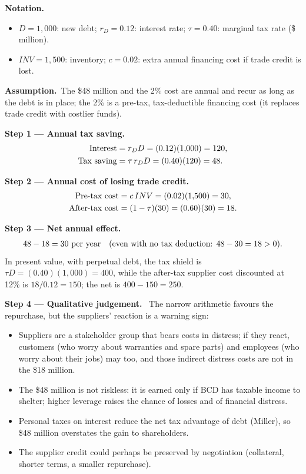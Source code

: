 \documentclass[11pt,a4paper]{article}
\newcommand{\notation}{\par\noindent\textbf{Notation.}}
\newcommand{\step}[2]{\par\medskip\noindent\textbf{Step #1 --- #2.}~}
\newcommand{\assume}{\par\smallskip\noindent\textbf{Assumption.}~}
\begin{document}
\notation
\begin{itemize}
  \item $D = 1{,}000$: new debt; $r_D = 0.12$: interest rate; $\tau = 0.40$: marginal tax rate (\$ million).
  \item $INV = 1{,}500$: inventory; $c = 0.02$: extra annual financing cost if trade credit is lost.
\end{itemize}
\assume The \$48 million and the 2\% cost are annual and recur as long as the debt is in place;
the 2\% is a pre-tax, tax-deductible financing cost (it replaces trade credit with costlier funds).

\step{1}{Annual tax saving}
\begin{align}
  \text{Interest} &= r_D D = (0.12)(1{,}000) = 120, \notag\\
  \text{Tax saving} &= \tau\, r_D D = (0.40)(120) = 48. \label{r5be12-ts}
\end{align}

\step{2}{Annual cost of losing trade credit}
\begin{align}
  \text{Pre-tax cost} &= c\, INV = (0.02)(1{,}500) = 30, \notag\\
  \text{After-tax cost} &= (1-\tau)(30) = (0.60)(30) = 18. \label{r5be12-sc}
\end{align}

\step{3}{Net annual effect}
\begin{align}
  48 - 18 = 30 \ \text{per year} \quad (\text{even with no tax deduction: } 48 - 30 = 18 > 0). \notag
\end{align}
In present value, with perpetual debt, the tax shield is $\tau D = (0.40)(1{,}000) = 400$, while
the after-tax supplier cost discounted at 12\% is $18/0.12 = 150$; the net is $400 - 150 = 250$.

\step{4}{Qualitative judgement}
The narrow arithmetic favours the repurchase, but the suppliers' reaction is a warning sign:
\begin{itemize}
  \item Suppliers are a stakeholder group that bears costs in distress; if they react, customers
        (who worry about warranties and spare parts) and employees (who worry about their jobs) may
        too, and those indirect distress costs are not in the \$18 million.
  \item The \$48 million is not riskless: it is earned only if BCD has taxable income to shelter;
        higher leverage raises the chance of losses and of financial distress.
  \item Personal taxes on interest reduce the net tax advantage of debt (Miller), so \$48 million
        overstates the gain to shareholders.
  \item The supplier credit could perhaps be preserved by negotiation (collateral, shorter terms,
        a smaller repurchase).
\end{itemize}
\end{document}
